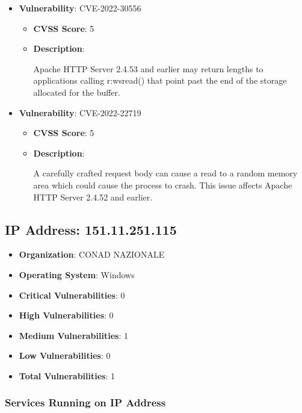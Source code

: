 \documentclass{article}
\begin{document}
\begin{itemize}
        \item \textbf{Vulnerability}: CVE-2022-30556
        \begin{itemize}
            \item \textbf{CVSS Score}:  5 
            \item \textbf{Description}:
            \parbox[t]{0.9\linewidth}{
                \ttfamily Apache HTTP Server 2.4.53 and earlier may return lengths to applications calling r:wsread() that point past the end of the storage allocated for the buffer.
            }
        \end{itemize}
    
        \item \textbf{Vulnerability}: CVE-2022-22719
        \begin{itemize}
            \item \textbf{CVSS Score}:  5 
            \item \textbf{Description}:
            \parbox[t]{0.9\linewidth}{
                \ttfamily A carefully crafted request body can cause a read to a random memory area which could cause the process to crash. This issue affects Apache HTTP Server 2.4.52 and earlier.
            }
        \end{itemize}
    
\end{itemize}




\clearpage



\subsection*{IP Address: 151.11.251.115}

\begin{itemize}
    \item \textbf{Organization}: CONAD NAZIONALE
    \item \textbf{Operating System}:  Windows 
    \item \textbf{Critical Vulnerabilities}: 0
    \item \textbf{High Vulnerabilities}: 0
    \item \textbf{Medium Vulnerabilities}: 1
    \item \textbf{Low Vulnerabilities}: 0
    \item \textbf{Total Vulnerabilities}: 1
\end{itemize}

\subsubsection*{Services Running on IP Address}
\end{document}

